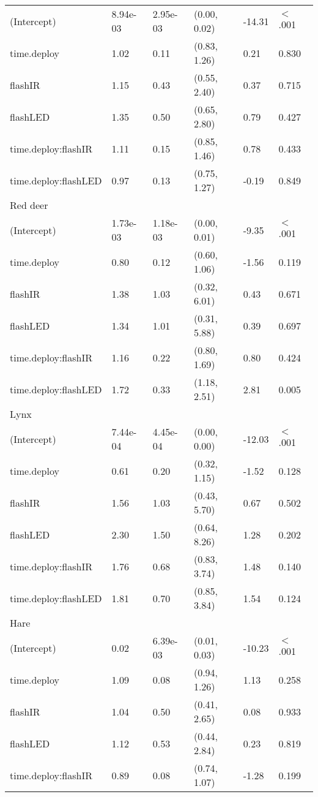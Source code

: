 \begin{table}[ht]
\begin{tabular}{llllll}
  (Intercept) & 8.94e-03 & 2.95e-03 & (0.00, 0.02) & -14.31 & $<$ .001 \\ 
  time.deploy & 1.02 & 0.11 & (0.83, 1.26) & 0.21 & 0.830  \\ 
  flashIR & 1.15 & 0.43 & (0.55, 2.40) & 0.37 & 0.715  \\ 
  flashLED & 1.35 & 0.50 & (0.65, 2.80) & 0.79 & 0.427  \\ 
  time.deploy:flashIR & 1.11 & 0.15 & (0.85, 1.46) & 0.78 & 0.433  \\ 
  time.deploy:flashLED & 0.97 & 0.13 & (0.75, 1.27) & -0.19 & 0.849  \\ 
  Red deer &  &  &  &  &        \\ 
  (Intercept) & 1.73e-03 & 1.18e-03 & (0.00, 0.01) & -9.35 & $<$ .001 \\ 
  time.deploy & 0.80 & 0.12 & (0.60, 1.06) & -1.56 & 0.119  \\ 
  flashIR & 1.38 & 1.03 & (0.32, 6.01) & 0.43 & 0.671  \\ 
  flashLED & 1.34 & 1.01 & (0.31, 5.88) & 0.39 & 0.697  \\ 
  time.deploy:flashIR & 1.16 & 0.22 & (0.80, 1.69) & 0.80 & 0.424  \\ 
  time.deploy:flashLED & 1.72 & 0.33 & (1.18, 2.51) & 2.81 & 0.005  \\ 
  Lynx &  &  &  &  &        \\ 
  (Intercept) & 7.44e-04 & 4.45e-04 & (0.00, 0.00) & -12.03 & $<$ .001 \\ 
  time.deploy & 0.61 & 0.20 & (0.32, 1.15) & -1.52 & 0.128  \\ 
  flashIR & 1.56 & 1.03 & (0.43, 5.70) & 0.67 & 0.502  \\ 
  flashLED & 2.30 & 1.50 & (0.64, 8.26) & 1.28 & 0.202  \\ 
  time.deploy:flashIR & 1.76 & 0.68 & (0.83, 3.74) & 1.48 & 0.140  \\ 
  time.deploy:flashLED & 1.81 & 0.70 & (0.85, 3.84) & 1.54 & 0.124  \\ 
  Hare &  &  &  &  &        \\ 
  (Intercept) & 0.02 & 6.39e-03 & (0.01, 0.03) & -10.23 & $<$ .001 \\ 
  time.deploy & 1.09 & 0.08 & (0.94, 1.26) & 1.13 & 0.258  \\ 
  flashIR & 1.04 & 0.50 & (0.41, 2.65) & 0.08 & 0.933  \\ 
  flashLED & 1.12 & 0.53 & (0.44, 2.84) & 0.23 & 0.819  \\ 
  time.deploy:flashIR & 0.89 & 0.08 & (0.74, 1.07) & -1.28 & 0.199  \\ 

\end{tabular}
\end{table}
